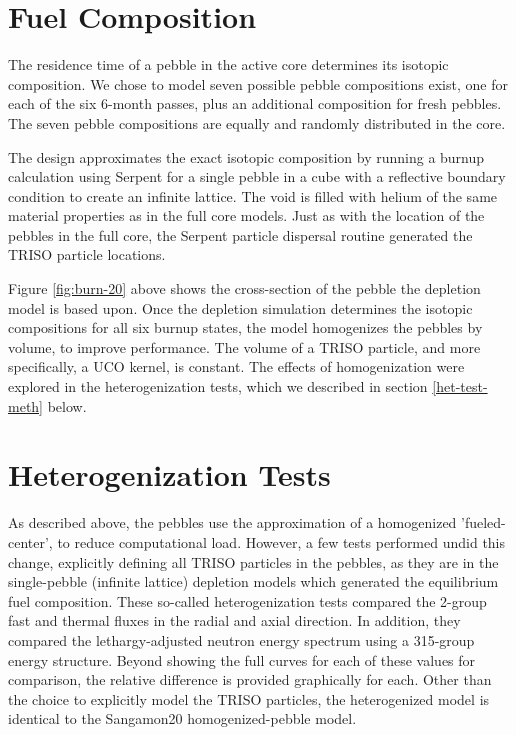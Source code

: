 \section{Fuel Composition}

The residence time of a pebble in the active core determines its isotopic composition.  We chose to model seven possible pebble compositions exist, one for each of the six 6-month passes, plus an additional composition for fresh pebbles.  The seven pebble compositions are equally and randomly distributed in the core.

The design approximates the exact isotopic composition by running a burnup calculation using Serpent for a single pebble in a cube with a reflective boundary condition to create an infinite lattice.  The void is filled with helium of the same material properties as in the full core models.  Just as with the location of the pebbles in the full core, the Serpent particle dispersal routine generated the TRISO particle locations.



Figure \ref{fig:burn-20} above shows the cross-section of the pebble the depletion model is based upon.  Once the depletion simulation determines the isotopic compositions for all six burnup states, the model homogenizes the pebbles by volume, to improve performance.  The volume of a TRISO particle, and more specifically, a UCO kernel, is constant.  The effects of homogenization were explored in the heterogenization tests, which we described in section \autoref{het-test-meth} below.

\section{Heterogenization Tests}
\label{het-test-meth}

As described above, the pebbles use the approximation of a homogenized 'fueled-center', to reduce computational load.  However, a few tests performed undid this change, explicitly defining all TRISO particles in the pebbles, as they are in the single-pebble (infinite lattice) depletion models which generated the equilibrium fuel composition.  These so-called heterogenization tests compared the 2-group fast and thermal fluxes in the radial and axial direction.  In addition, they compared the lethargy-adjusted neutron energy spectrum using a 315-group energy structure.  Beyond showing the full curves for each of these values for comparison, the relative difference is provided graphically for each.  Other than the choice to explicitly model the TRISO particles, the heterogenized model is identical to the Sangamon20 homogenized-pebble model.

